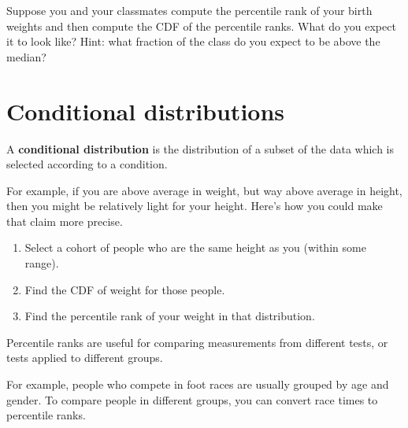 \documentclass[12pt]{book}
\begin{document}
\begin{ex}

Suppose you and your classmates compute the percentile rank of your
birth weights and then compute the CDF of the percentile ranks.  What do
you expect it to look like?  Hint: what fraction of the class do you
expect to be above the median?


\end{ex}


\section{Conditional distributions}


A {\bf conditional distribution} is the distribution of a subset of
the data which is selected according to a condition.

For example, if you are above average in weight, but way above average
in height, then you might be relatively light for your height.  Here's
how you could make that claim more precise.

\begin{enumerate}


\item Select a cohort of people who are the same height as you (within
some range).

\item Find the CDF of weight for those people.

\item Find the percentile rank of your weight in that distribution.

\end{enumerate}

Percentile ranks are useful for comparing measurements from
different tests, or tests applied to different groups.


For example, people who compete in foot races are usually grouped by
age and gender.  To compare people in different groups, you can convert
race times to percentile ranks.
\end{document}
